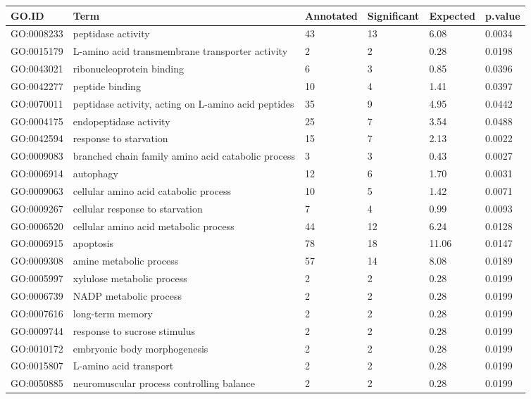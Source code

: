 \documentclass[10pt]{bmc_article}
\newenvironment{bmcformat}{\begin{raggedright}\baselineskip20pt\sloppy\setboolean{publ}{false}}{\end{raggedright}\baselineskip20pt\sloppy}
\begin{document}
\begin{bmcformat}
\begin{longtable}{lp{4.5cm}llll}
 GO.ID & Term & Annotated & Significant & Expected & p.value \\ 
  \hline
GO:0008233 & peptidase activity &  43 &  13 & 6.08 & 0.0034 \\ 
  GO:0015179 & L-amino acid transmembrane transporter activity &   2 &   2 & 0.28 & 0.0198 \\ 
  GO:0043021 & ribonucleoprotein binding &   6 &   3 & 0.85 & 0.0396 \\ 
  GO:0042277 & peptide binding &  10 &   4 & 1.41 & 0.0397 \\ 
  GO:0070011 & peptidase activity, acting on L-amino acid peptides &  35 &   9 & 4.95 & 0.0442 \\ 
  GO:0004175 & endopeptidase activity &  25 &   7 & 3.54 & 0.0488 \\ 
   \hline
GO:0042594 & response to starvation &  15 &   7 & 2.13 & 0.0022 \\ 
  GO:0009083 & branched chain family amino acid catabolic process &   3 &   3 & 0.43 & 0.0027 \\ 
  GO:0006914 & autophagy &  12 &   6 & 1.70 & 0.0031 \\ 
  GO:0009063 & cellular amino acid catabolic process &  10 &   5 & 1.42 & 0.0071 \\ 
  GO:0009267 & cellular response to starvation &   7 &   4 & 0.99 & 0.0093 \\ 
  GO:0006520 & cellular amino acid metabolic process &  44 &  12 & 6.24 & 0.0128 \\ 
  GO:0006915 & apoptosis &  78 &  18 & 11.06 & 0.0147 \\ 
  GO:0009308 & amine metabolic process &  57 &  14 & 8.08 & 0.0189 \\ 
  GO:0005997 & xylulose metabolic process &   2 &   2 & 0.28 & 0.0199 \\ 
  GO:0006739 & NADP metabolic process &   2 &   2 & 0.28 & 0.0199 \\ 
  GO:0007616 & long-term memory &   2 &   2 & 0.28 & 0.0199 \\ 
  GO:0009744 & response to sucrose stimulus &   2 &   2 & 0.28 & 0.0199 \\ 
  GO:0010172 & embryonic body morphogenesis &   2 &   2 & 0.28 & 0.0199 \\ 
  GO:0015807 & L-amino acid transport &   2 &   2 & 0.28 & 0.0199 \\ 
  GO:0050885 & neuromuscular process controlling balance &   2 &   2 & 0.28 & 0.0199 \\ 

\end{longtable}
\end{bmcformat}
\end{document}
